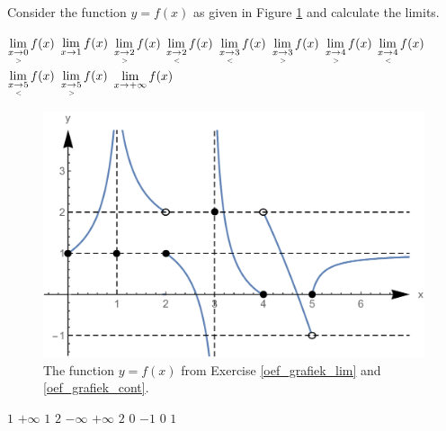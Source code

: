 \begin{Exercise}[difficulty = 1, label = oef_grafiek_lim] Consider the function $y=f(x)$ as given in Figure \ref{fig_lim_23} and calculate the limits.

\begin{multicols}{3}
\Question $\displaystyle\lim_{x\underset{>}{\rightarrow}  0} f(x)$ 
\Question $\displaystyle\lim_{x\rightarrow 1} f(x)$
\Question $ \displaystyle\lim_{x\underset{>}{\rightarrow}  2} f(x) $
\Question $ \displaystyle\lim_{x\underset{<}{\rightarrow} 2} f(x)$
\Question $\displaystyle\lim_{x\underset{<}{\rightarrow} 3} f(x)$
\Question $\displaystyle\lim_{x\underset{>}{\rightarrow} 3} f(x) $
\Question $ \displaystyle\lim_{x\underset{>}{\rightarrow} 4} f(x)$ 
\Question $\displaystyle\lim_{x\underset{<}{\rightarrow}4} f(x) $
\Question $ \displaystyle\lim_{x\underset{<}{\rightarrow} 5} f(x) $
\Question $ \displaystyle\lim_{x\underset{>}{\rightarrow} 5} f(x)$ 
\Question $\displaystyle\lim_{x\rightarrow +\infty} f(x) $
\EndCurrentQuestion 
\end{multicols}

\begin{figure}[H]
	\begin{center}
		\includegraphics[scale=0.6]{fig_lim_23}
	\end{center}
	\caption{The function $y=f(x)$ from Exercise \ref{oef_grafiek_lim} \ifanalysis and \ref{oef_grafiek_cont}\fi.}
	\label{fig_lim_23}
\end{figure}

\end{Exercise}

\begin{Answer}\phantom{}
    
	\begin{multicols}{3}
		\Question $1$ 
		\Question $+ \infty$
		\Question $ 1$
		\Question $ 2$
		\Question $- \infty$
		\Question $+ \infty$
		\Question $ 2$ 
		\Question $0 $
		\Question $-1 $
		\Question $ 0$ 
		\Question $1 $
	\EndCurrentQuestion
	\end{multicols}
\end{Answer}



